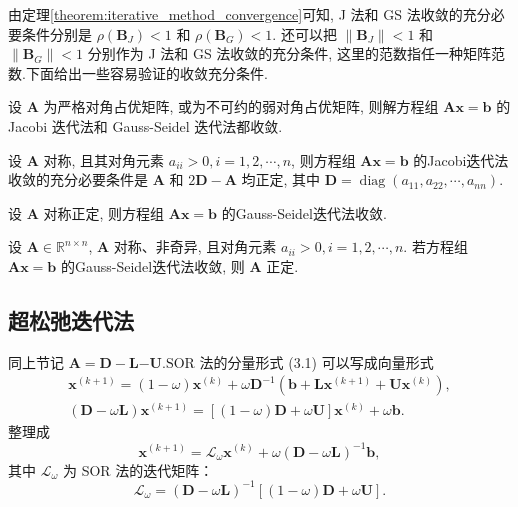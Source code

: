 由定理\ref{theorem:iterative_method_convergence}可知, J 法和 GS 法收敛的充分必要条件分别是 $\rho\left(\boldsymbol{B}_J\right)<1$ 和 $\rho\left(\boldsymbol{B}_G\right)<1$. 还可以把 $\left\|\boldsymbol{B}_J\right\|<1$ 和 $\left\|\boldsymbol{B}_G\right\|<1$ 分别作为 J 法和 GS 法收敛的充分条件, 这里的范数指任一种矩阵范数.下面给出一些容易验证的收敛充分条件.
\begin{theorem}[对角占优矩阵的迭代法收敛性]\label{theorem:iterative_method_convergence_of_diagonally_dominant_matrix}
    设 $\boldsymbol{A}$ 为严格对角占优矩阵, 或为不可约的弱对角占优矩阵, 则解方程组 $\boldsymbol{A x}=\boldsymbol{b}$ 的 Jacobi 迭代法和 Gauss-Seidel 迭代法都收敛.
\end{theorem}
\begin{theorem}[对称矩阵的Jacobi迭代法收敛条件]\label{theorem:iterative_method_convergence_of_symmetric_matrix}
    设 $\boldsymbol{A}$ 对称, 且其对角元素 $a_{i i}>0, i=1,2, \cdots, n$, 则方程组 $\boldsymbol{A x}=\boldsymbol{b}$ 的Jacobi迭代法收敛的充分必要条件是 $\boldsymbol{A}$ 和 $2 \boldsymbol{D}-\boldsymbol{A}$ 均正定, 其中 $\boldsymbol{D}=\operatorname{diag}\left(a_{11}, a_{22}, \cdots, a_{n n}\right)$.
\end{theorem}
\begin{theorem}\label{theorem:gs_convergence_symmetric_positive_definite}
    设 $\boldsymbol{A}$ 对称正定, 则方程组 $\boldsymbol{A x}=\boldsymbol{b}$ 的Gauss-Seidel迭代法收敛.
\end{theorem}

\begin{theorem}\label{theorem:gs_convergence_necessary_condition}
    设 $\boldsymbol{A} \in \mathbb{R}^{n \times n}$, $\boldsymbol{A}$ 对称、非奇异, 且对角元素 $a_{i i}>0, i=1,2, \cdots, n$. 若方程组 $\boldsymbol{A x}=\boldsymbol{b}$ 的Gauss-Seidel迭代法收敛, 则 $\boldsymbol{A}$ 正定.
\end{theorem}

\subsection{超松弛迭代法}

同上节记 $\boldsymbol{A}=\boldsymbol{D}-\boldsymbol{L} \boldsymbol{-} \boldsymbol{U} . \mathrm{SOR}$ 法的分量形式 (3.1) 可以写成向量形式
$$
    \begin{gathered}
        \boldsymbol{x}^{(k+1)}=(1-\omega) \boldsymbol{x}^{(k)}+\omega \boldsymbol{D}^{-1}\left(\boldsymbol{b}+\boldsymbol{L} \boldsymbol{x}^{(k+1)}+\boldsymbol{U} \boldsymbol{x}^{(k)}\right), \\
        (\boldsymbol{D}-\omega \boldsymbol{L}) \boldsymbol{x}^{(k+1)}=[(1-\omega) \boldsymbol{D}+\omega \boldsymbol{U}] \boldsymbol{x}^{(k)}+\omega \boldsymbol{b} .
    \end{gathered}
$$
整理成
$$
    \boldsymbol{x}^{(k+1)}=\mathscr{L}_\omega \boldsymbol{x}^{(k)}+\omega(\boldsymbol{D}-\omega \boldsymbol{L})^{-1} \boldsymbol{b},
$$
其中 $\mathscr{L}_\omega$ 为 SOR 法的迭代矩阵：
$$
    \mathscr{L}_\omega=(\boldsymbol{D}-\omega \boldsymbol{L})^{-1}[(1-\omega) \boldsymbol{D}+\omega \boldsymbol{U}] .
$$


